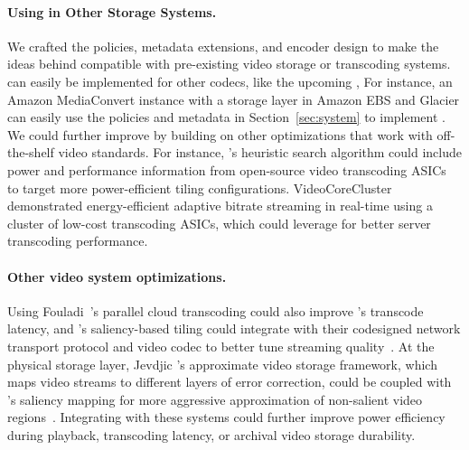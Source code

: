 \paragraph{Using \name in Other Storage Systems.}
We crafted the policies, metadata extensions, and encoder design to make the ideas behind \nameStore{} compatible with pre-existing video storage or transcoding systems.
\name can easily be implemented for other codecs, like the upcoming \avone,
For instance, an Amazon MediaConvert instance with a storage layer in Amazon EBS and Glacier can easily use the policies and metadata in Section~\ref{sec:system} to implement \name.
We could further improve \name by building on other optimizations that work with off-the-shelf video standards.
For instance, \name's heuristic search algorithm could include power and performance information from open-source video transcoding ASICs~\cite{asicclouds, zhang2017racetosleep} to target more power-efficient tiling configurations.
VideoCoreCluster~\cite{liu2016greenvid} demonstrated energy-efficient adaptive bitrate streaming in real-time using a cluster of low-cost transcoding ASICs, which \name could leverage for better server transcoding performance.

\paragraph{Other video system optimizations.}
Using Fouladi~\etal's parallel cloud transcoding could also improve \name's transcode latency, and \name's saliency-based tiling could integrate with their codesigned network transport protocol and video codec to better tune streaming quality~\cite{fouladi2018salsify, fouladi2017excamera}.
At the physical storage layer, Jevdjic \etal's approximate video storage framework, which maps video streams to different layers of error correction, could be coupled with \name's saliency mapping for more aggressive approximation of non-salient video regions~\cite{jevdjic2017approxvid}.
Integrating \name with these systems could further improve power efficiency during playback, transcoding latency, or archival video storage durability.
